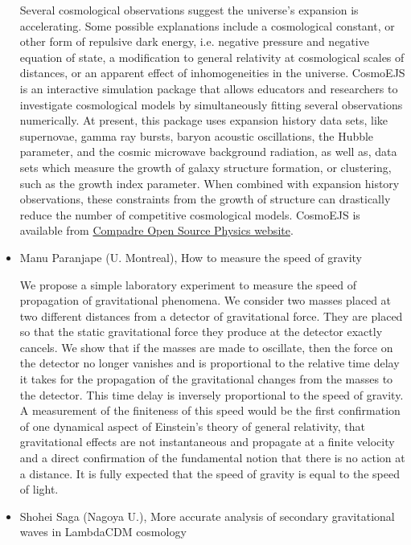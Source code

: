 \documentclass[letterpaper,12pt]{article}
\newcommand{\talk}[2]{{\fontspec{Lato Bold} #1,} {\fontspec{Lato Italic} #2}}
\begin{document}
\begin{itemize}
Several cosmological observations suggest the universe’s expansion is accelerating. Some possible explanations include a cosmological constant, or other form of repulsive dark energy, i.e. negative pressure and negative equation of state, a modification to general relativity at cosmological scales of distances, or an apparent effect of inhomogeneities in the universe.  CosmoEJS is an interactive simulation package that allows educators and researchers to investigate cosmological models by simultaneously fitting several observations numerically.  At present, this package uses expansion history data sets, like supernovae, gamma ray bursts, baryon acoustic oscillations, the Hubble parameter, and the cosmic microwave background radiation, as well as, data sets which measure the growth of galaxy structure formation, or clustering, such as the growth index parameter.  When combined with expansion history observations, these constraints from the growth of structure can drastically reduce the number of competitive cosmological models. CosmoEJS is available from \href{http://www.compadre.org/osp/items/detail.cfm?ID=12406}{Compadre Open Source Physics website}.


\item \talk{Manu Paranjape (U. Montreal)}{How to measure the speed of gravity}

We propose a simple laboratory experiment to measure the speed of propagation of gravitational phenomena. We consider two masses placed at two different distances from a detector of gravitational force. They are placed so that the static gravitational force they produce at the detector exactly cancels. We show that if the masses are made to oscillate, then the force on the detector no longer vanishes and is proportional to the relative time delay it takes for the propagation of the gravitational changes from the masses to the detector. This time delay is inversely proportional to the speed of gravity. A measurement of the finiteness of this speed would be the first confirmation of one dynamical aspect of Einstein's theory of general relativity, that gravitational effects are not instantaneous and propagate at a finite velocity and a direct confirmation of the fundamental notion that there is no action at a distance. It is fully expected that the speed of gravity is equal to the speed of light. 

\item \talk{Shohei Saga (Nagoya U.)}{More accurate analysis of secondary gravitational waves in LambdaCDM cosmology}


\end{itemize}
\end{document}
